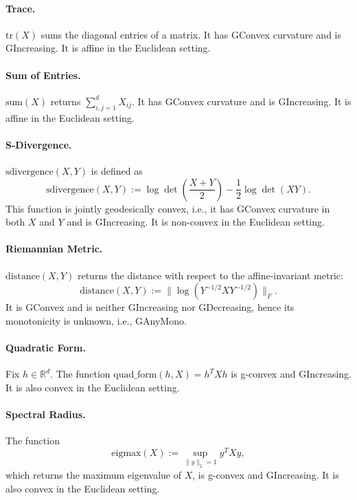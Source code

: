 \paragraph{Trace.} $\text{tr}(X)$ sums the diagonal entries of a matrix. It has GConvex curvature and is GIncreasing. It is affine in the Euclidean setting.

\paragraph{Sum of Entries.} $\text{sum}(X)$ returns $\sum_{i,j=1}^d X_{ij}$. It has GConvex curvature and is GIncreasing. It is affine in the Euclidean setting.

\paragraph{S-Divergence.} $\text{sdivergence}(X,Y)$ is defined as
\begin{equation}
\text{sdivergence}(X,Y) := \log \det\left(\frac{X + Y}{2}\right) - \frac{1}{2}\log \det(XY).
\end{equation}
This function is jointly geodesically convex, i.e., it has GConvex curvature in both $X$ and $Y$ and is GIncreasing. It is non-convex in the Euclidean setting.

\paragraph{Riemannian Metric.} $\text{distance}(X,Y)$ returns the distance with respect to the affine-invariant metric:
\begin{equation}
\text{distance}(X,Y) := \|{\log(Y^{-1/2} X Y^{-1/2})}\|_F.
\end{equation}
It is GConvex and is neither GIncreasing nor GDecreasing, hence its monotonicity is unknown, i.e., GAnyMono.

\paragraph{Quadratic Form.} Fix $h \in \mathbb{R}^d$. The function $\text{quad\_form}(h, X) = h^T X h$ is g-convex and GIncreasing. It is also convex in the Euclidean setting.

\paragraph{Spectral Radius.} The function
\begin{equation}
\text{eigmax}(X) := \sup_{\|y\|_2=1} y^T X y,
\end{equation}
which returns the maximum eigenvalue of $X$, is g-convex and GIncreasing. It is also convex in the Euclidean setting.

